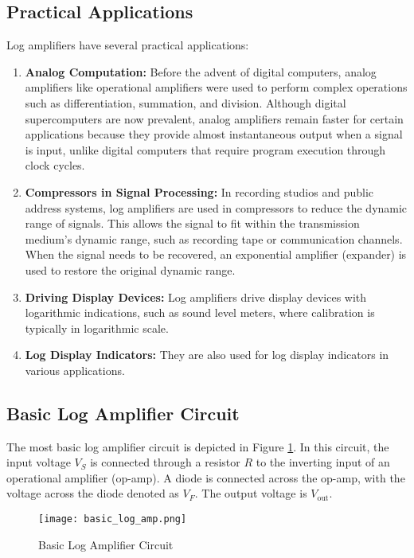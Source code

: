 \subsection{Practical Applications}
Log amplifiers have several practical applications:
\begin{enumerate}
    \item \textbf{Analog Computation:} Before the advent of digital computers, analog amplifiers like operational amplifiers were used to perform complex operations such as differentiation, summation, and division. Although digital supercomputers are now prevalent, analog amplifiers remain faster for certain applications because they provide almost instantaneous output when a signal is input, unlike digital computers that require program execution through clock cycles.
    
    \item \textbf{Compressors in Signal Processing:} In recording studios and public address systems, log amplifiers are used in compressors to reduce the dynamic range of signals. This allows the signal to fit within the transmission medium's dynamic range, such as recording tape or communication channels. When the signal needs to be recovered, an exponential amplifier (expander) is used to restore the original dynamic range.
    
    \item \textbf{Driving Display Devices:} Log amplifiers drive display devices with logarithmic indications, such as sound level meters, where calibration is typically in logarithmic scale.
    
    \item \textbf{Log Display Indicators:} They are also used for log display indicators in various applications.
\end{enumerate}

\subsection{Basic Log Amplifier Circuit}
The most basic log amplifier circuit is depicted in Figure \ref{fig:basic_log_amp}. In this circuit, the input voltage \(V_S\) is connected through a resistor \(R\) to the inverting input of an operational amplifier (op-amp). A diode is connected across the op-amp, with the voltage across the diode denoted as \(V_F\). The output voltage is \(V_{\text{out}}\).

\begin{figure}[h]
    \centering
    \texttt{[image: basic\_log\_amp.png]}
    \caption{Basic Log Amplifier Circuit}
    \label{fig:basic_log_amp}
\end{figure}

